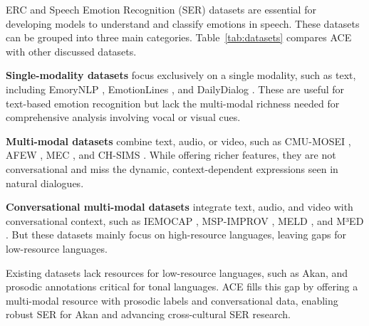 
ERC and Speech Emotion Recognition (SER) datasets are essential for developing models to understand and classify emotions in speech. These datasets can be grouped into three main categories. Table~\ref{tab:datasets} compares ACE with other discussed datasets.

\textbf{Single-modality datasets} focus exclusively on a single modality, such as text, including EmoryNLP \cite{zahiri2018emotion}, EmotionLines \cite{chen1802emotionlines}, and DailyDialog \cite{li2017dailydialog}. These are useful for text-based emotion recognition but lack the multi-modal richness needed for comprehensive analysis involving vocal or visual cues.

\textbf{Multi-modal datasets} combine text, audio, or video, such as CMU-MOSEI \cite{zadeh2018multimodal}, AFEW \cite{fromcollecting}, MEC \cite{li2018mec}, and CH-SIMS \cite{yu2020ch}. While offering richer features, they are not conversational and miss the dynamic, context-dependent expressions seen in natural dialogues.

\textbf{Conversational multi-modal datasets} integrate text, audio, and video with conversational context, such as IEMOCAP \cite{busso2008iemocap}, MSP-IMPROV \cite{busso2016msp}, MELD \cite{poria2018meld}, and M³ED \cite{zhao2022m3ed}. But these datasets mainly focus on high-resource languages, leaving gaps for low-resource languages.

Existing datasets lack resources for low-resource languages, such as Akan, and prosodic annotations critical for tonal languages. ACE fills this gap by offering a multi-modal resource with prosodic labels and conversational data, enabling robust SER for Akan and advancing cross-cultural SER research. 




